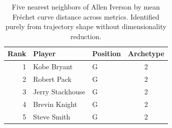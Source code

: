 \begin{table}[htbp]
  \centering\small
  \begin{tabular}{rllc}
    \toprule
    Rank & Player & Position & Archetype \\
    \midrule
    1 & Kobe Bryant & G & 2 \\
    2 & Robert Pack & G & 2 \\
    3 & Jerry Stackhouse & G & 2 \\
    4 & Brevin Knight & G & 2 \\
    5 & Steve Smith & G & 2 \\
    \bottomrule
  \end{tabular}
  \caption{Five nearest neighbors of Allen Iverson by mean Fr\'{e}chet curve distance across metrics. Identified purely from trajectory shape without dimensionality reduction.}
  \label{tab:Allen_Iverson_frechet_curve_neighbors}
\end{table}

